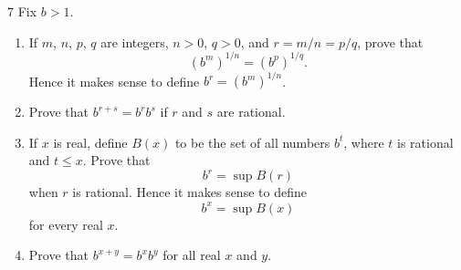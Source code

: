 \begin{exercise}{7}
Fix $b>1$.
\begin{enumerate}
\item[(a)] If $m$, $n$, $p$, $q$ are integers, $n>0$, $q>0$, and $r=m/n=p/q$, prove that 
 \[
 (b^m)^{1/n}=(b^p)^{1/q}.
 \]
 Hence it makes sense to define $b^r = (b^m)^{1/n}$.
 \item[(b)] Prove that $b^{r+s} = b^r b^s$ if $r$ and $s$ are rational.
 \item[(c)] If $x$ is real, define $B(x)$ to be the set of all numbers $b^t$, where $t$ is rational and $t \leq x$. 
Prove that \[b^r = \sup B(r)\] when $r$ is rational.
Hence it makes sense to define \[b^x = \sup B(x)\] for every real $x$.
\item[(d)] Prove that $b^{x+y}=b^xb^y$ for all real $x$ and $y$.
\end{enumerate}
\end{exercise}
